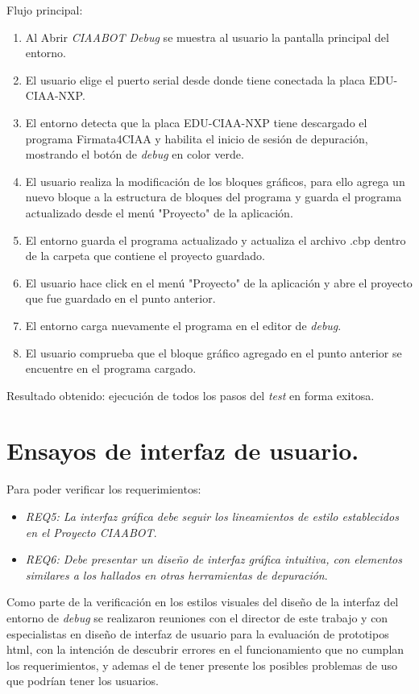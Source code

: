 Flujo principal:
\begin{enumerate}
	\item
	Al Abrir \emph{CIAABOT Debug} se muestra al usuario la pantalla principal del entorno.
	\item
	El usuario elige el puerto serial desde donde tiene conectada la placa EDU-CIAA-NXP.
	\item
	El entorno detecta que la placa EDU-CIAA-NXP tiene descargado el programa Firmata4CIAA y habilita el inicio de sesión de depuración, mostrando el botón de \emph{debug} en color verde.
	\item
	El usuario realiza la modificación de los bloques gráficos, para ello agrega un nuevo bloque a la estructura de bloques del programa y guarda el programa actualizado desde el menú "Proyecto" de la aplicación.
	\item
	El entorno guarda el programa actualizado y actualiza el archivo .cbp dentro de la carpeta que contiene el proyecto guardado.
	\item
	El usuario hace click en el menú "Proyecto" de la aplicación y abre el proyecto que fue guardado en el punto anterior.
	\item
	El entorno carga nuevamente el programa en el editor de \emph{debug}.
	\item
	El usuario comprueba que el bloque gráfico agregado en el punto anterior se encuentre en el programa cargado.
\end{enumerate}

Resultado obtenido: ejecución de todos los pasos del \emph{test} en forma exitosa.


\section{Ensayos de interfaz de usuario.}
\label{sec:Ensayos de interfaz de usuario.}

Para poder verificar los requerimientos:
\begin{itemize}
	\item \emph{REQ5: La interfaz gráfica debe seguir los lineamientos de estilo establecidos en el Proyecto CIAABOT}.
	\item \emph{REQ6: Debe presentar un diseño de interfaz gráfica intuitiva, con elementos similares a los hallados en otras herramientas de depuración}.
\end{itemize}

Como parte de la verificación en los estilos visuales del diseño de la interfaz del entorno de \emph{debug} se realizaron reuniones con el director de este trabajo y con especialistas en diseño de interfaz de usuario para la evaluación de prototipos html, con la intención de descubrir errores en el funcionamiento que no cumplan los requerimientos, y ademas el de tener presente los posibles problemas de uso que podrían tener los usuarios.


